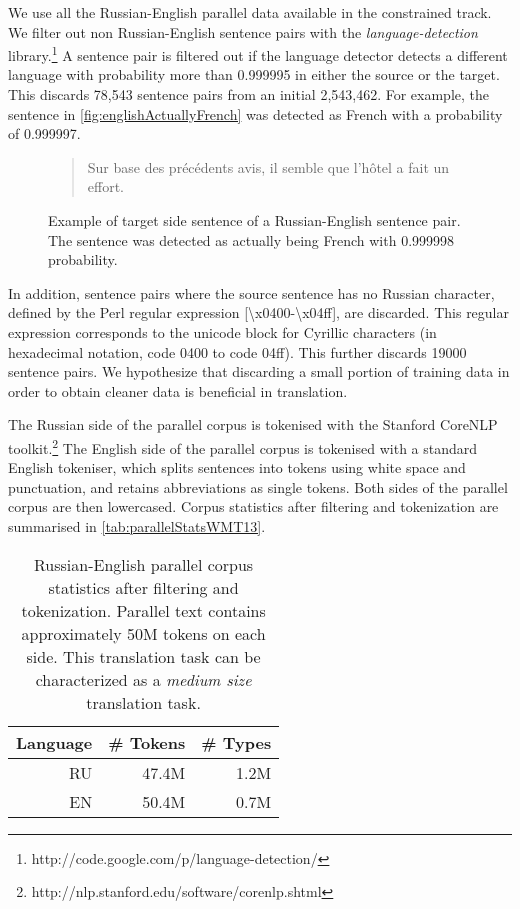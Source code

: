 We use all the Russian-English parallel data available in the constrained track.
We filter out non Russian-English sentence pairs with the
\emph{language-detection} library.\footnote{http://code.google.com/p/language-detection/}
A sentence pair is filtered out if the language detector detects a different language with probability
more than 0.999995 in either the source or the target.
This discards 78,543 sentence pairs from an initial 2,543,462.
For example, the sentence in \autoref{fig:englishActuallyFrench} was detected as French with
a probability of 0.999997.
%
\begin{figure}
\begin{quote}
Sur base des précédents avis, il semble que l'hôtel a fait un effort.
\end{quote}
\caption{Example of target side sentence of a Russian-English sentence pair. The sentence was detected as actually being French with 0.999998 probability.}
\label{fig:englishActuallyFrench}
\end{figure}
%
In addition, sentence pairs where the source sentence has no Russian character, defined by the
Perl regular expression [{\textbackslash}x{0400}-{\textbackslash}x{04ff}], are discarded.
This regular expression corresponds to the unicode block for Cyrillic
characters (in hexadecimal notation, code 0400 to code 04ff).
This further discards 19000 sentence pairs. We hypothesize
that discarding a small portion of training data in order to
obtain cleaner data is beneficial in translation.

The Russian side of the parallel corpus is tokenised with the
Stanford CoreNLP toolkit.\footnote{http://nlp.stanford.edu/software/corenlp.shtml}
The English side of the parallel corpus is tokenised with a standard English tokeniser,
which splits sentences into tokens using white space and punctuation, and retains
abbreviations as single tokens.
Both sides of the parallel corpus are then lowercased. %
Corpus statistics after filtering and tokenization are summarised in
\autoref{tab:parallelStatsWMT13}.
%
\begin{table}[htbp]
\begin{center}
\begin{tabular}{*{3}{|r}|}
\hline
Language & \# Tokens & \# Types \\
\hline
\hline
RU & 47.4M & 1.2M \\
\hline
EN & 50.4M & 0.7M \\
\hline
\end{tabular}
\end{center}
\caption{Russian-English parallel corpus statistics after filtering
  and tokenization.
  Parallel text contains approximately 50M tokens on each side. This translation
  task can be characterized as a \emph{medium size} translation task.}
\label{tab:parallelStatsWMT13}
\end{table}
%

